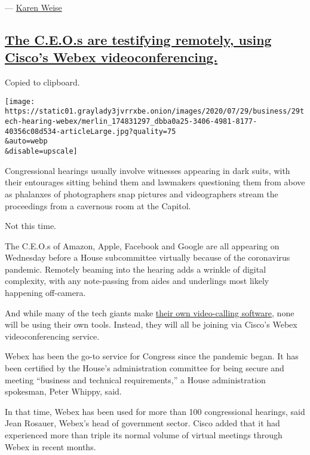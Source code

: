 --- \href{https://www.nytimes3xbfgragh.onion/by/karen-weise}{Karen
Weise}

\hypertarget{the-ceos-are-testifying-remotely-using-ciscos-webex-videoconferencing}{%
\subsection{\texorpdfstring{\protect\hyperlink{the-ceos-are-testifying-remotely-using-ciscos-webex-videoconferencing}{The
C.E.O.s are testifying remotely, using Cisco's Webex
videoconferencing.}}{The C.E.O.s are testifying remotely, using Cisco's Webex videoconferencing.}}\label{the-ceos-are-testifying-remotely-using-ciscos-webex-videoconferencing}}

Copied to clipboard.

\texttt{[image: https://static01.graylady3jvrrxbe.onion/images/2020/07/29/business/29tech-hearing-webex/merlin\_174831297\_dbba0a25-3406-4981-8177-40356c08d534-articleLarge.jpg?quality=75\\\&auto=webp\\\&disable=upscale]}

Congressional hearings usually involve witnesses appearing in dark
suits, with their entourages sitting behind them and lawmakers
questioning them from above as phalanxes of photographers snap pictures
and videographers stream the proceedings from a cavernous room at the
Capitol.

Not this time.

The C.E.O.s of Amazon, Apple, Facebook and Google are all appearing on
Wednesday before a House subcommittee virtually because of the
coronavirus pandemic. Remotely beaming into the hearing adds a wrinkle
of digital complexity, with any note-passing from aides and underlings
most likely happening off-camera.

And while many of the tech giants make
\href{https://www.nytimes3xbfgragh.onion/2020/04/24/technology/zoom-rivals-virus-facebook-google.html}{their
own video-calling software}, none will be using their own tools.
Instead, they will all be joining via Cisco's Webex videoconferencing
service.

Webex has been the go-to service for Congress since the pandemic began.
It has been certified by the House's administration committee for being
secure and meeting ``business and technical requirements,'' a House
administration spokesman, Peter Whippy, said.

In that time, Webex has been used for more than 100 congressional
hearings, said Jean Rosauer, Webex's head of government sector. Cisco
added that it had experienced more than triple its normal volume of
virtual meetings through Webex in recent months.

